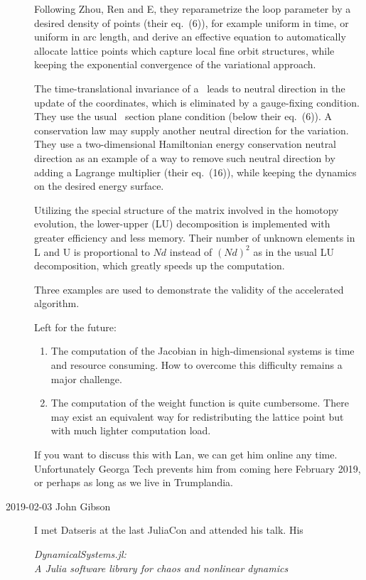 \begin{description}
{Following Zhou,  Ren  and E, they reparametrize the loop
parameter by a desired density of points (their eq.~(6)), for example uniform
in time, or uniform in arc length, and derive an effective equation
to automatically allocate lattice points which capture local fine
orbit structures, while keeping the exponential convergence of the variational
approach.

The time-translational invariance of a \po\ leads to neutral direction in the
update of the coordinates, which is eliminated by a gauge-fixing
condition. They use the usual \Poincare\
section plane condition (below their eq.~(6)). A conservation law may supply
another neutral direction for the variation. They use a two-dimensional
Hamiltonian energy conservation neutral direction as an example of a way to
remove such neutral direction by adding a Lagrange multiplier (their eq.~(16)),
while keeping the dynamics on the desired energy surface.

Utilizing the special structure of the matrix involved in the homotopy
evolution, the lower-upper (LU) decomposition is implemented with gre\-at\-er
efficiency and less memory. Their number of unknown elements in L and U is
proportional to $Nd$ instead of $(Nd)^2$ as in the usual LU decomposition,
which greatly speeds up the computation.

Three examples are used to demonstrate the validity of the accelerated
algorithm.

Left for the future:
\begin{enumerate}
  \item
The computation of the Jacobian in high-dimensional systems is time and
resource consuming. How to overcome this difficulty remains a major challenge.
  \item
The computation of the weight function is quite cumbersome. There may exist an
equivalent way for redistributing the lattice point but with much lighter
computation load.
\end{enumerate}

If you want to discuss this with Lan, we can get him online any time. Unfortunately
Georga Tech prevents him from coming here
February 2019, or perhaps as long as we live in Trumplandia.
    }

    \item[2019-02-03 John Gibson]
I met Datseris at the last JuliaCon and attended his talk. His

{\em {DynamicalSystems}.jl:\\ {A Julia} software library for chaos and nonlinear
dynamics}\rf{Datseris18}


\end{description}
